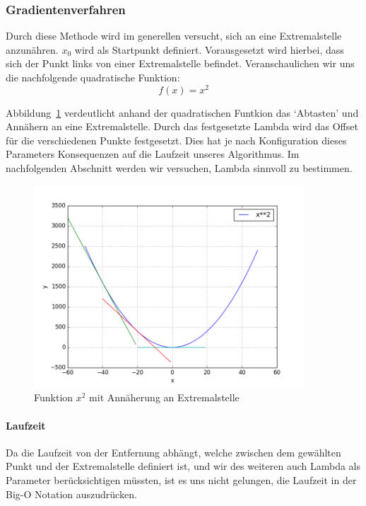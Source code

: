 \documentclass[10pt]{article}         %
\begin{document}
\subsubsection{Gradientenverfahren}
Durch diese Methode wird im generellen versucht, sich an eine Extremalstelle anzunähren. $x_0$ wird als Startpunkt definiert. Vorausgesetzt wird hierbei, dass sich der Punkt links von einer Extremalstelle befindet. Veranschaulichen wir uns die nachfolgende quadratische Funktion:
\[
    f(x)=x^2
\]

Abbildung~\ref{gradientx} verdeutlicht anhand der quadratischen Funtkion das `Abtasten' und Annähern an eine Extremalstelle. Durch das festgesetzte Lambda wird das Offset für die verschiedenen Punkte festgesetzt. Dies hat je nach Konfiguration dieses Parameters Konsequenzen auf die Laufzeit unseres Algorithmus. Im nachfolgenden Abschnitt werden wir versuchen, Lambda sinnvoll zu bestimmen.

\begin{figure}[!ht]
    \centering
    \includegraphics[width=0.9\textwidth]{gradient}
    \caption{Funktion $x^2$ mit Annäherung an Extremalstelle}\label{gradientx}
\end{figure}

\paragraph{Laufzeit}
Da die Laufzeit von der Entfernung abhängt, welche zwischen dem gewählten Punkt und der Extremalstelle definiert ist, und wir des weiteren auch Lambda als Parameter berücksichtigen müssten, ist es uns nicht gelungen, die Laufzeit in der Big-O Notation auszudrücken.
\end{document}

